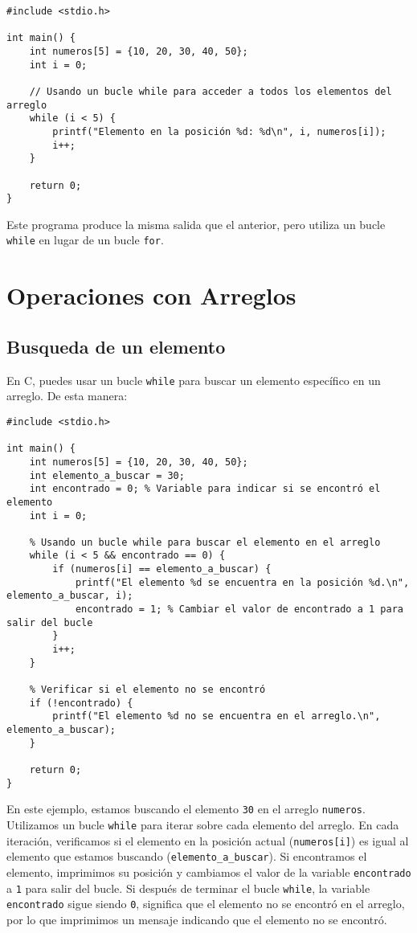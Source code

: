 \documentclass{article}
\begin{document}
\begin{verbatim}
#include <stdio.h>

int main() {
    int numeros[5] = {10, 20, 30, 40, 50};
    int i = 0;

    // Usando un bucle while para acceder a todos los elementos del arreglo
    while (i < 5) {
        printf("Elemento en la posición %d: %d\n", i, numeros[i]);
        i++;
    }

    return 0;
}
\end{verbatim}

Este programa produce la misma salida que el anterior, pero utiliza un bucle \texttt{while} en lugar de un bucle \texttt{for}.

\section{Operaciones con Arreglos}
\subsection{Busqueda de un elemento}
En C, puedes usar un bucle \texttt{while} para buscar un elemento específico en un arreglo. De esta manera:

\newpage

\begin{verbatim}
#include <stdio.h>

int main() {
    int numeros[5] = {10, 20, 30, 40, 50};
    int elemento_a_buscar = 30;
    int encontrado = 0; % Variable para indicar si se encontró el elemento
    int i = 0;

    % Usando un bucle while para buscar el elemento en el arreglo
    while (i < 5 && encontrado == 0) {
        if (numeros[i] == elemento_a_buscar) {
            printf("El elemento %d se encuentra en la posición %d.\n", elemento_a_buscar, i);
            encontrado = 1; % Cambiar el valor de encontrado a 1 para salir del bucle
        }
        i++;
    }

    % Verificar si el elemento no se encontró
    if (!encontrado) {
        printf("El elemento %d no se encuentra en el arreglo.\n", elemento_a_buscar);
    }

    return 0;
}
\end{verbatim}


En este ejemplo, estamos buscando el elemento \texttt{30} en el arreglo \texttt{numeros}. Utilizamos un bucle \texttt{while} para iterar sobre cada elemento del arreglo. En cada iteración, verificamos si el elemento en la posición actual (\texttt{numeros[i]}) es igual al elemento que estamos buscando (\texttt{elemento\_a\_buscar}). Si encontramos el elemento, imprimimos su posición y cambiamos el valor de la variable \texttt{encontrado} a \texttt{1} para salir del bucle.
Si después de terminar el bucle \texttt{while}, la variable \texttt{encontrado} sigue siendo \texttt{0}, significa que el elemento no se encontró en el arreglo, por lo que imprimimos un mensaje indicando que el elemento no se encontró.
\end{document}
